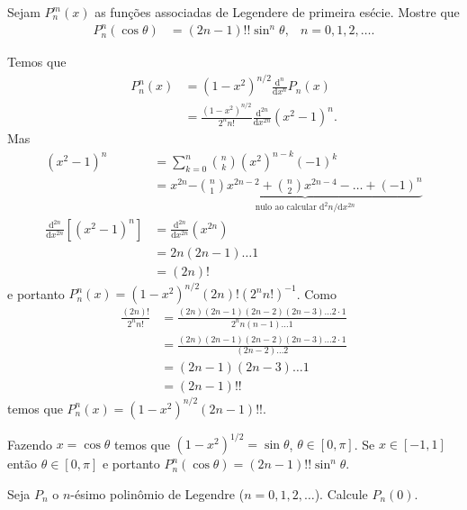 \documentclass[a4paper,12pt, leqno, answers]{exam}
\begin{document}
\begin{questions}
    \question Sejam $P_n^m(x)$ as fun\c{c}\~{o}es associadas de Legendere de primeira es\'{e}cie. Mostre que
    \begin{align*}
        P_n^n(\cos \theta) &= \left( 2n - 1 \right)!! \sin^n \theta, & n = 0, 1, 2, \ldots.
    \end{align*}
    \begin{solution}
        Temos que
        \begin{align*}
            P_n^n(x) &= (1 - x^2)^{n / 2} \frac{\mathrm{d}^n}{\mathrm{d}x^n} P_n(x) \\
            &= \frac{(1 - x^2)^{n / 2}}{2^n n!} \frac{\mathrm{d}^{2n}}{\mathrm{d}x^{2n}} (x^2 - 1)^n.
        \end{align*}
        Mas
        \begin{align*}
            (x^2 - 1)^n &= \sum_{k = 0}^n \binom{n}{k} (x^2)^{n - k} (-1)^k \\
            &= x^{2n} \underbrace{- \binom{n}{1} x^{2n - 2} + \binom{n}{2} x^{2n - 4} - \ldots + (-1)^n}_{\text{nulo ao calcular $\mathrm{d}^2n/\mathrm{d}x^{2n}$}} \\
            \frac{\mathrm{d} ^{2n}}{\mathrm{d}x^{2n}} \left[ \left( x^2 - 1 \right)^n \right] &= \frac{\mathrm{d}^{2n}}{\mathrm{d}x^{2n}} \left( x^{2n} \right) \\
            &= 2n (2n - 1) \ldots 1 \\
            &= (2n)!
        \end{align*}
        e portanto $P_n^n(x) = \left( 1 - x^2 \right)^{n / 2} (2n)! \left( 2^n n! \right)^{-1}$.
        Como
        \begin{align*}
            \frac{(2n)!}{2^n n!} &= \frac{(2n) (2n - 1) (2n - 2) (2n - 3) \ldots 2 \cdot 1}{2^n n (n - 1) \ldots 1} \\
            &= \frac{(2n) (2n - 1) (2n - 2) (2n - 3) \ldots 2 \cdot 1}{(2n - 2) \ldots 2} \\
            &= (2n - 1) (2n - 3) \ldots 1 \\
            &= (2n - 1)!!
        \end{align*}
        temos que $P_n^n(x) = \left( 1 - x^2 \right)^{n / 2} (2n - 1)!!$.

        Fazendo $x = \cos \theta$ temos que $(1 - x^2)^{1/2} = \sin \theta$, $\theta \in [0, \pi]$. Se $x \in [-1, 1]$ ent\~{a}o $\theta \in [0, \pi]$ e portanto $P_n^n(\cos \theta) = (2n - 1)!! \sin^n \theta$.
    \end{solution}

    \question[T6 de 2010] Seja $P_n$ o $n$-\'{e}simo polin\^{o}mio de Legendre ($n = 0, 1, 2, \ldots$). Calcule $P_n(0)$.
    \begin{solution}
    \end{solution}


\end{questions}
\end{document}
